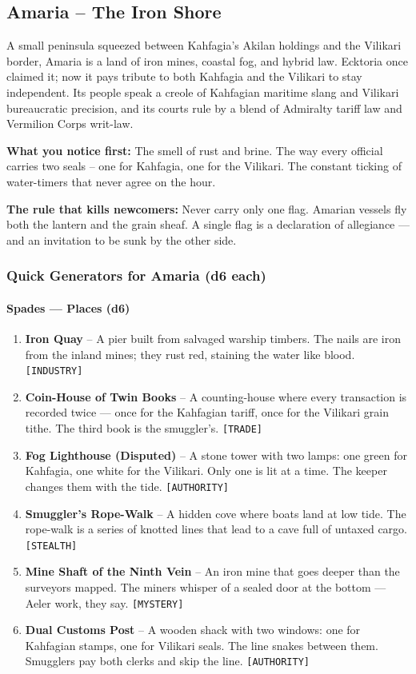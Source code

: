 \subsection*{Amaria -- The Iron Shore}
\label{sec:kahfagia-amaria}

A small peninsula squeezed between Kahfagia's Akilan holdings and the Vilikari border, Amaria is a land of iron mines, coastal fog, and hybrid law. Ecktoria once claimed it; now it pays tribute to both Kahfagia and the Vilikari to stay independent. Its people speak a creole of Kahfagian maritime slang and Vilikari bureaucratic precision, and its courts rule by a blend of Admiralty tariff law and Vermilion Corps writ-law.

\textbf{What you notice first:} The smell of rust and brine. The way every official carries two seals -- one for Kahfagia, one for the Vilikari. The constant ticking of water-timers that never agree on the hour.

\textbf{The rule that kills newcomers:} Never carry only one flag. Amarian vessels fly both the lantern and the grain sheaf. A single flag is a declaration of allegiance --- and an invitation to be sunk by the other side.

\subsubsection*{Quick Generators for Amaria (d6 each)}

\paragraph{Spades --- Places (d6)}
\begin{enumerate}
\item \textbf{Iron Quay} -- A pier built from salvaged warship timbers. The nails are iron from the inland mines; they rust red, staining the water like blood. \texttt{[INDUSTRY]}
\item \textbf{Coin-House of Twin Books} -- A counting-house where every transaction is recorded twice --- once for the Kahfagian tariff, once for the Vilikari grain tithe. The third book is the smuggler's. \texttt{[TRADE]}
\item \textbf{Fog Lighthouse (Disputed)} -- A stone tower with two lamps: one green for Kahfagia, one white for the Vilikari. Only one is lit at a time. The keeper changes them with the tide. \texttt{[AUTHORITY]}
\item \textbf{Smuggler's Rope-Walk} -- A hidden cove where boats land at low tide. The rope-walk is a series of knotted lines that lead to a cave full of untaxed cargo. \texttt{[STEALTH]}
\item \textbf{Mine Shaft of the Ninth Vein} -- An iron mine that goes deeper than the surveyors mapped. The miners whisper of a sealed door at the bottom --- Aeler work, they say. \texttt{[MYSTERY]}
\item \textbf{Dual Customs Post} -- A wooden shack with two windows: one for Kahfagian stamps, one for Vilikari seals. The line snakes between them. Smugglers pay both clerks and skip the line. \texttt{[AUTHORITY]}
\end{enumerate}

